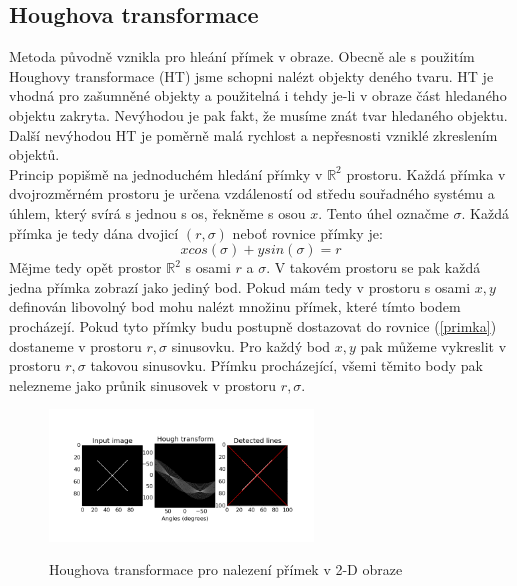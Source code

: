 \documentclass{thesis}%
\begin{document}
\subsection{Houghova transformace}
Metoda původně vznikla pro hleání přímek v obraze. Obecně ale s použitím Houghovy transformace (HT) jsme schopni nalézt objekty deného tvaru. HT je vhodná pro zašumněné objekty a použitelná i tehdy je-li v obraze část hledaného objektu zakryta. Nevýhodou je pak fakt, že musíme znát tvar hledaného objektu. Další nevýhodou HT je poměrně malá rychlost a nepřesnosti vzniklé zkreslením objektů.\\
Princip popišmě na jednoduchém hledání přímky v $\mathbb{R}^{2}$ prostoru. Každá přímka v dvojrozměrném prostoru je určena vzdáleností od středu souřadného systému a úhlem, který svírá s jednou s os, řekněme s osou $x$. Tento úhel označme $\sigma$. Každá přímka je tedy dána dvojicí $(r,\sigma)$ neboť rovnice přímky je:
\begin{equation}
x cos(\sigma) + y sin(\sigma) = r
\label{primka}         
\end{equation}
Mějme tedy opět prostor $\mathbb{R}^{2}$ s osami $r$ a $\sigma$. V takovém prostoru se pak každá jedna přímka zobrazí jako jediný bod. Pokud mám tedy v prostoru s osami $x,y$ definován libovolný bod mohu nalézt množinu přímek, které tímto bodem procházejí. Pokud tyto přímky budu postupně dostazovat do rovnice (\ref{primka}) dostaneme v prostoru $r,\sigma$ sinusovku. Pro každý bod $x,y$ pak můžeme vykreslit v prostoru $r,\sigma$ takovou sinusovku. Přímku procházející, všemi těmito body pak nelezneme jako průnik sinusovek v prostoru $r,\sigma$.

 \begin{figure}[htp!]
  
	\centering\includegraphics[width=7cm]{hough_trans.png}\\
	\caption[Houghova transformace]{Houghova transformace pro nalezení přímek v 2-D obraze}
\end{figure}
\end{document}
